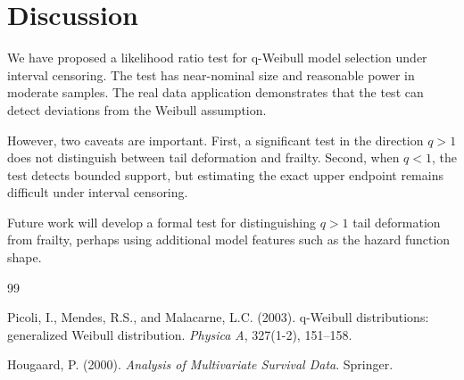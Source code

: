 \documentclass[11pt,a4paper]{article}
\begin{document}
\section{Discussion}

We have proposed a likelihood ratio test for q-Weibull model selection under interval censoring. The test has near-nominal size and reasonable power in moderate samples. The real data application demonstrates that the test can detect deviations from the Weibull assumption.

However, two caveats are important. First, a significant test in the direction $q>1$ does not distinguish between tail deformation and frailty. Second, when $q<1$, the test detects bounded support, but estimating the exact upper endpoint remains difficult under interval censoring.

Future work will develop a formal test for distinguishing $q>1$ tail deformation from frailty, perhaps using additional model features such as the hazard function shape.


\begin{thebibliography}{99}

Picoli, I., Mendes, R.S., and Malacarne, L.C. (2003). q-Weibull distributions: generalized Weibull distribution. \emph{Physica A}, 327(1-2), 151--158.

Hougaard, P. (2000). \emph{Analysis of Multivariate Survival Data}. Springer.

\end{thebibliography}
\end{document}

